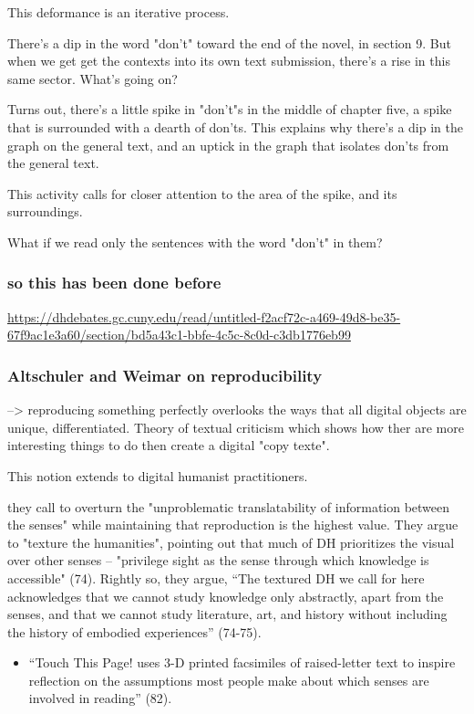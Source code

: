 \documentclass[11pt]{article}
\begin{document}
This deformance is an iterative process. 

There's a dip in the word "don't" toward the end of the novel, in
section 9. But when we get get the contexts into its own text
submission, there's a rise in this same sector. What's going on? 

Turns out, there's a little spike in "don't"s in the middle of chapter
five, a spike that is surrounded with a dearth of don'ts. This
explains why there's a dip in the graph on the general text, and an
uptick in the graph that isolates don'ts from the general text.

This activity calls for closer attention to the area of the spike, and
its surroundings.

What if we read only the sentences with the word "don't" in them?

\subsubsection{so this has been done before}
\label{sec:orgbcbfc32}
\url{https://dhdebates.gc.cuny.edu/read/untitled-f2acf72c-a469-49d8-be35-67f9ac1e3a60/section/bd5a43c1-bbfe-4c5c-8c0d-c3db1776eb99}
\subsubsection{Altschuler and Weimar on reproducibility}
\label{sec:org9f78b6c}

--> reproducing something perfectly overlooks the ways that all
digital objects are unique, differentiated. Theory of textual
criticism which shows how ther are more interesting things to do then
create a digital "copy texte". 

This notion extends to digital humanist practitioners. 

they call to overturn the "unproblematic translatability of
information between the senses" while maintaining that reproduction is
the highest value. They argue to "texture the humanities", pointing
out that much of DH prioritizes the visual over other senses --
"privilege sight as the sense through which knowledge is accessible"
(74). Rightly so, they argue, “The textured DH we call for here
acknowledges that we cannot study knowledge only abstractly, apart
from the senses, and that we cannot study literature, art, and history
without including the history of embodied experiences” (74-75).
\begin{itemize}
\item “Touch This Page! uses 3-D printed facsimiles of raised-letter text
to inspire reflection on the assumptions most people make about
which senses are involved in reading” (82).
\end{itemize}
\end{document}
